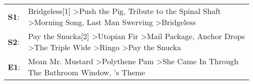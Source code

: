 \begin{supertabular}{p{0.03\textwidth}p{0.92\textwidth}}
 \textbf{S1}:  &                                                  Bridgeless[1]\textsuperscript{} \textgreater \enspace Push the Pig\textsuperscript{}, \enspace Tribute to the Spinal Shaft\textsuperscript{} \textgreater \enspace Morning Song\textsuperscript{}, \enspace Last Man Swerving\textsuperscript{} \textgreater \enspace Bridgeless\textsuperscript{}  \enspace  \\
 \textbf{S2}:  &  Pay the Snucka[2]\textsuperscript{} \textgreater \enspace Utopian Fir\textsuperscript{} \textgreater \enspace Mail Package\textsuperscript{}, \enspace Anchor Drops\textsuperscript{} \textgreater \enspace The Triple Wide\textsuperscript{} \textgreater \enspace Ringo\textsuperscript{} \textgreater \enspace Pay the Snucka\textsuperscript{}  \enspace  \\
 \textbf{E1}:  &                                                                                                                                     Mean Mr. Mustard\textsuperscript{} \textgreater \enspace Polythene Pam\textsuperscript{} \textgreater \enspace She Came In Through The Bathroom Window\textsuperscript{}, 's Theme\textsuperscript{}  \enspace  \\
\end{supertabular}
